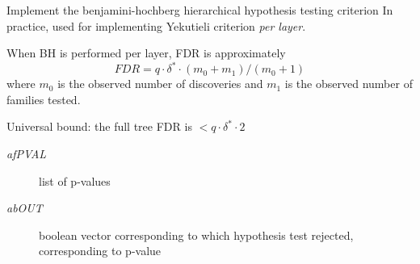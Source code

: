 \documentclass[letterpaper,10pt,english]{sphinxmanual}
\begin{document}

\begin{fulllineitems}
\label{index:halla.stats.bh}
Implement the benjamini-hochberg hierarchical hypothesis testing criterion 
In practice, used for implementing Yekutieli criterion \emph{per layer}.

When BH is performed per layer, FDR is approximately
\begin{equation}FDR = q \cdot \delta^{*} \cdot(m_0 + m_1)/(m_0+1)\end{equation}
where $m_0$ is the observed number of discoveries and $m_1$ is the observed number of families tested.

Universal bound: the full tree FDR is $< q \cdot \delta^{*} \cdot 2$
\begin{description}
\item[{\emph{afPVAL}}] \leavevmode
list of p-values

\item[{\emph{abOUT}}] \leavevmode
boolean vector corresponding to which hypothesis test rejected, corresponding to p-value

\end{description}

\end{fulllineitems}

\end{document}
